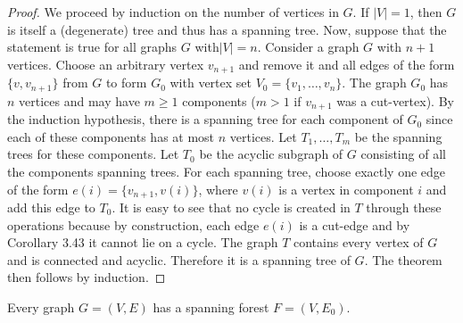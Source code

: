 \begin{proof}
We proceed by induction on the number of vertices in \(G\).
If \(|V| = 1\), then \(G\) is itself a (degenerate) tree and thus has a spanning tree.
Now, suppose that the statement is true for all graphs \(G\) with\( |V|= n\).
Consider a graph \(G\) with \(n+1\) vertices.
Choose an arbitrary vertex \(v_{n+1}\) and remove it and all edges of the form \(\{v, v_{n+1}\}\) from \(G\) to form \(G_0\) with vertex set \(V_0 =\{v_1,\dots,v_n\}\).
The graph \(G_0\) has \(n\) vertices and may have \(m\geq 1\) components (\(m > 1\) if \(v_{n+1}\) was a cut-vertex).
By the induction hypothesis, there is a spanning tree for each component of \(G_0\) since each of these components has at most \(n\) vertices.
Let \(T_1,\dots,T_m\) be the spanning trees for these components.
Let \(T_0\) be the acyclic subgraph of \(G\) consisting of all the components spanning trees.
For each spanning tree, choose exactly one edge of the form \(e(i) = \{v_{n+1}, v(i)\}\), where \(v(i)\) is a vertex in component \(i\) and add this edge to \(T_0\).
It is easy to see that no cycle is created in \(T\) through these operations because by construction, each edge \(e(i)\) is a cut-edge and by Corollary 3.43 it cannot lie on a cycle. The graph \(T\) contains every vertex of \(G\) and is connected and acyclic.
Therefore it is a spanning tree of \(G\).
The theorem then follows by induction.
\end{proof}
%
\begin{corollary}
Every graph \(G = (V,E)\) has a spanning forest \(F = (V,E_0)\).
\end{corollary}
